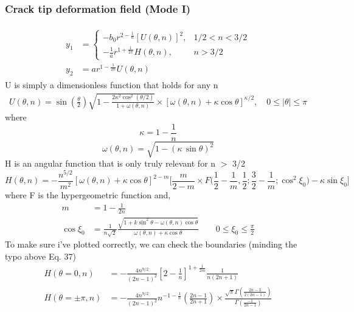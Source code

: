 \documentclass[12pt,3p]{article}
\numberwithin{equation}{section}
\begin{document}
\subsubsection{Crack tip deformation field (Mode I)}
\begin{align}\label{EqDisp}
\begin{split}
y_{1} &= \left\{\begin{array}{ll}
-b_{0} r^{2-\frac{1}{n}}[U(\theta, n)]^{2}, & 1 / 2<n<3 / 2 \\
-\frac{1}{a} r^{1+\frac{1}{2 \pi}} H(\theta, n), & n>3 / 2
\end{array}\right. \\
y_2 &= a r^{1 - \frac{1}{2n}} U (\theta, n) 
\end{split}
\end{align}
U is simply a dimensionless function that holds for any n 
\begin{align}\label{EqU}
U (\theta, n) = \sin (\frac{\theta}{2}) \sqrt{1-\frac{2 \kappa^{2} \cos ^{2}(\theta / 2)}{1+\omega(\theta, n)}} \times[\omega(\theta, n)+\kappa \cos \theta]^{\kappa / 2}, \quad 0 \leq|\theta| \leq \pi
\end{align}
where 
\begin{equation}\label{EqKappa}
\kappa = 1 - \frac{1}{n}
\end{equation}
\begin{equation}\label{EqOmega}
\omega (\theta, n) = \sqrt{1 - (\kappa \, \sin \theta)^2}
\end{equation}
H is an angular function that is only truly relevant for n $>$ 3/2 
\begin{equation}
H(\theta, n) = -\frac{n^{5 / 2}}{m^{2}}[\omega(\theta, n)+ \kappa \cos \theta]^{2-m} \bigg[ \frac{m}{2-m} \times F \bigg(\frac{1}{2}-\frac{1}{m}, \frac{1}{2} ; \frac{3}{2}-\frac{1}{m} ; \cos ^{2} \xi_{0} \bigg) -\kappa \sin \xi_{0} \bigg]
\end{equation}
where F is the hypergeometric function and, 
\begin{align*}
m &= 1 - \frac{1}{2n} \\
\cos \xi_{0} &= \frac{1}{n \sqrt{2}} \frac{\sqrt{1+k \sin ^{2} \theta-\omega(\theta, n) \cos \theta}}{\omega(\theta, n)+\kappa \cos \theta} 
\quad \quad 0 \leq \xi_{0} \leq \frac{\pi}{2}
\end{align*}
To make sure i've plotted correctly, we can check the boundaries (minding the typo above Eq. 37)
\begin{align*}
H(\theta=0, n) &= -\frac{4 n^{9 / 2}}{(2 n-1)^{2}}\left[2-\frac{1}{n}\right]^{1+\frac{1}{2 m}} \frac{1}{n(2 n+1)} \\
H(\theta = \pm \pi, n) &= -\frac{4 n^{9 / 2}}{(2 n-1)^{2}} n^{-1-\frac{1}{n}}\left(\frac{2 n-1}{2 n+1}\right) \times \frac{\sqrt{\pi} \Gamma\left(\frac{2 n-3}{2(2 n-1)}\right)}{\Gamma\left(\frac{-1}{2 n-1}\right)}
\end{align*}
\end{document}
